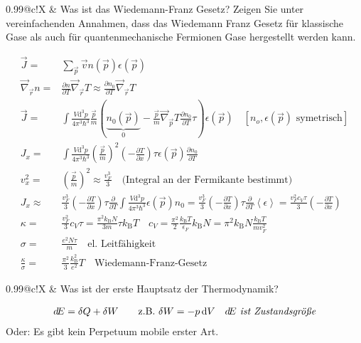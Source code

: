 \documentclass[a4paper,12pt]{scrartcl}
\makeatletter
\def\pf#1#2{\frac{\partial #1}{\partial #2}}		%
\def\ka#1{\left(#1\right)}				%
\def\kb#1{\left\langle #1\right\rangle}			%
\def\d{\mathrm{d}}					%
\def\ddd{\mathrm{d}^3}					%
\def\kB{k_\mathrm{B}}					%
\newcounter{qc}\setcounter{qc}{1}
\newenvironment{fshaded}{
\def\FrameCommand{\fcolorbox{framecolor}{shadecolor}}
\MakeFramed {\FrameRestore}}
{\endMakeFramed}
\def\frage#1{
\begin{fshaded}
\noindent
\begin{tabularx}{0.99\textwidth}{@{}c!{\color{framecolor}\vline}X}
{ \bf \rm \theqc }	&	\noindent #1
\end{tabularx}
\stepcounter{qc}
\end{fshaded}
}
\makeatother
\begin{document}
\frage{Was ist das Wiedemann-Franz Gesetz? Zeigen Sie unter vereinfachenden Annahmen, dass das Wiedemann Franz Gesetz für 
klassische Gase als auch für quantenmechanische Fermionen Gase hergestellt werden kann.}
\noindent
\begin{align*}
	\vec J=&\sum_{\vec p}\vec vn(\vec p)\epsilon(\vec p)\\
	\vec\nabla_{\vec r}n=&\pf nT\vec\nabla_{\vec r}T\approx\pf{n_0}T\vec\nabla_{\vec r}T\\
	\vec J=&\int\frac{V\ddd p}{4\pi^3\hbar^3}\frac{\vec p}m(\underbrace{n_0(\vec p)}_{0}-\frac{\vec p}{m}\vec\nabla_{\vec 
p}T\pf{n_0}T\tau)\epsilon(\vec p)\quad[n_o,\epsilon(\vec p)\text{ symetrisch}]\\
	J_x=&\int\frac{V\ddd p}{4\pi^3\hbar^3}\ka{\frac{\vec p}m}^2\ka{-\pf Tx}\tau\epsilon(\vec p)\pf{n_0}T\\
	v_x^2=&\ka{\frac{\vec p}m}^2\approx\frac{v_F^3}3\quad\text{(Integral an der Fermikante bestimmt)}\\
	J_x\approx&\frac{v_F^3}3\ka{-\pf Tx}\tau\pf{}T\int \frac{V\ddd p}{4\pi^3\hbar^3}\epsilon(\vec 
p)n_0=\frac{v_F^3}3\ka{-\pf Tx}\tau\pf{}T\kb\epsilon=\frac{v_F^2c_V\tau}3\ka{-\pf Tx}\\
	\kappa=&\frac{v_F^2}3c_V\tau=\frac{\pi^2\kB N}{3m}\tau \kB T\quad 
c_V=\frac{\pi^2}{2}\frac{\kB T}{\epsilon_F}\kB N=\pi^2\kB N\frac{\kB T}{mv_F^2}\\
	\sigma=&\frac{e^2N\tau}m\quad\text{el. Leitfähigkeit}\\
	\frac\kappa\sigma=&\frac{\pi^2}3\frac{\kB ^2}{e^2}T\quad\text{Wiedemann-Franz-Gesetz}
\end{align*}


\frage{Was ist der erste Hauptsatz der Thermodynamik?}
\noindent
\begin{align*}
	&d\!E=\delta Q+\delta W\qquad\text{z.B. $\delta W=-p\,\d V $}&\text{\it $d\!E$ ist Zustandsgröße}
\end{align*}
Oder: Es gibt kein Perpetuum mobile erster Art.
\end{document}
